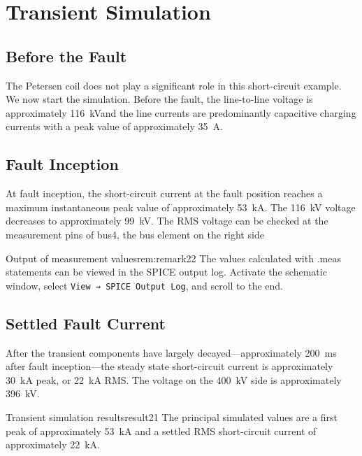 \section{Transient Simulation}
\label{sec:section23}

\subsection{Before the Fault}
The Petersen coil does not play a significant role in this short-circuit example.
We now start the simulation.
Before the fault, the line-to-line voltage is approximately
\SI{116}{\kilo\volt}and the line currents are predominantly capacitive charging
currents with a peak value of approximately \SI{35}{\ampere}.

\subsection{Fault Inception}
At fault inception, the short-circuit current at the fault position reaches a maximum instantaneous peak
value of approximately \SI{53}{\kilo\ampere}. The \SI{116}{\kilo\volt} voltage decreases to
approximately \SI{99}{\kilo\volt}. The RMS voltage can be checked at the measurement pins of bus4, the bus element on the right side

\begin{remark}{Output of measurement values}{rem:remark22}
The values calculated with .meas statements can be viewed in the SPICE output log. Activate the schematic window, select \texttt{View → SPICE Output Log}, and scroll to the end.
\end{remark}

\subsection{Settled Fault Current}
\label{sec:scc-simulation}
After the transient components have largely decayed---approximately
\SI{200}{\milli\second} after fault inception---the steady state short-circuit current is
approximately \SI{30}{\kilo\ampere} peak, or \SI{22}{\kilo\ampere} RMS. The
voltage on the \SI{400}{\kilo\volt} side is approximately
\SI{396}{\kilo\volt}.

\begin{result}{Transient simulation results}{result21}
The principal simulated values are a first peak of approximately
\SI{53}{\kilo\ampere} and a settled RMS short-circuit current of approximately
\SI{22}{\kilo\ampere}.
\end{result}

